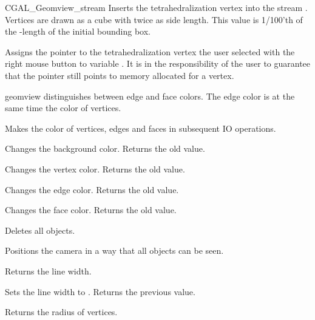 \begin{ccClass}{CGAL_Geomview_stream}
{Inserts the tetrahedralization vertex  into the stream \ccVar.
 Vertices are drawn as a cube with twice 
 as side length. This value is 1/100'th of the -length of the
initial bounding box.}


{Assigns the pointer to the tetrahedralization vertex the user selected
 with the right mouse button to variable . 
\ccPrecond It is in the responsibility of the user to guarantee that the
pointer still points to memory allocated for a vertex.}


geomview distinguishes between edge and face colors. The edge color
is at the same time the color of vertices. 

{Makes  the color of vertices, edges and faces in subsequent IO 
 operations.}

{Changes the background color. Returns the old value.}

{Changes the vertex color. Returns the old value.}

{Changes the edge color. Returns the old value.}


{Changes the face color. Returns the old value.}



{Deletes all objects.}

{Positions the camera in a way that all objects can be seen.}

{Returns the line width.}

{Sets the line width to . Returns the previous value.}

{Returns the radius of vertices.}


\end{ccClass}
